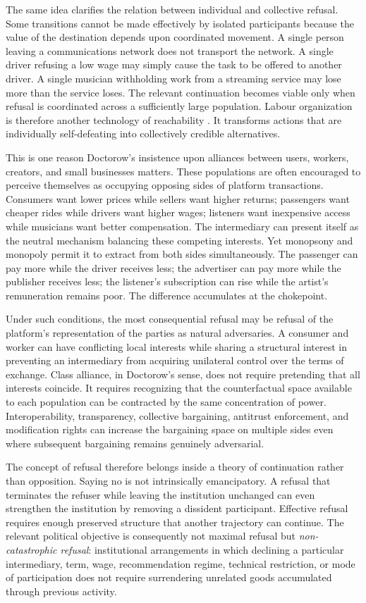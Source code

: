 \documentclass[11pt]{article}
\begin{document}
The same idea clarifies the relation between individual and collective refusal. Some transitions cannot be made effectively by isolated participants because the value of the destination depends upon coordinated movement. A single person leaving a communications network does not transport the network. A single driver refusing a low wage may simply cause the task to be offered to another driver. A single musician withholding work from a streaming service may lose more than the service loses. The relevant continuation becomes viable only when refusal is coordinated across a sufficiently large population. Labour organization is therefore another technology of reachability \citep{olson1965collective,schelling1978micromotives}. It transforms actions that are individually self-defeating into collectively credible alternatives.

This is one reason Doctorow's insistence upon alliances between users, workers, creators, and small businesses matters. These populations are often encouraged to perceive themselves as occupying opposing sides of platform transactions. Consumers want lower prices while sellers want higher returns; passengers want cheaper rides while drivers want higher wages; listeners want inexpensive access while musicians want better compensation. The intermediary can present itself as the neutral mechanism balancing these competing interests. Yet monopsony and monopoly permit it to extract from both sides simultaneously. The passenger can pay more while the driver receives less; the advertiser can pay more while the publisher receives less; the listener's subscription can rise while the artist's remuneration remains poor. The difference accumulates at the chokepoint.

Under such conditions, the most consequential refusal may be refusal of the platform's representation of the parties as natural adversaries. A consumer and worker can have conflicting local interests while sharing a structural interest in preventing an intermediary from acquiring unilateral control over the terms of exchange. Class alliance, in Doctorow's sense, does not require pretending that all interests coincide. It requires recognizing that the counterfactual space available to each population can be contracted by the same concentration of power. Interoperability, transparency, collective bargaining, antitrust enforcement, and modification rights can increase the bargaining space on multiple sides even where subsequent bargaining remains genuinely adversarial.

The concept of refusal therefore belongs inside a theory of continuation rather than opposition. Saying no is not intrinsically emancipatory. A refusal that terminates the refuser while leaving the institution unchanged can even strengthen the institution by removing a dissident participant. Effective refusal requires enough preserved structure that another trajectory can continue. The relevant political objective is consequently not maximal refusal but \emph{non-catastrophic refusal}: institutional arrangements in which declining a particular intermediary, term, wage, recommendation regime, technical restriction, or mode of participation does not require surrendering unrelated goods accumulated through previous activity.
\end{document}
